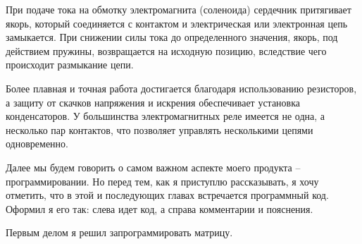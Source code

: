 \documentclass[a4paper, 12pt]{article}
\begin{document}
При подаче тока на обмотку электромагнита (соленоида) сердечник притягивает
якорь, который соединяется с контактом и электрическая или электронная цепь
замыкается. При снижении силы тока до определенного значения, якорь, под
действием пружины, возвращается на исходную позицию, вследствие чего
происходит размыкание цепи.

Более плавная и точная работа достигается благодаря использованию резисторов,
а защиту от скачков напряжения и искрения обеспечивает установка конденсаторов.
У большинства электромагнитных реле имеется не одна, а несколько пар
контактов, что позволяет управлять несколькими цепями одновременно.

Далее мы будем говорить о самом важном аспекте моего продукта --
программировании. Но перед тем, как я приступлю рассказывать, я хочу отметить,
что в этой и последующих главах встречается программный код. Оформил я его так:
слева идет код, а справа комментарии и пояснения.

Первым делом я решил запрограммировать матрицу.\newpage
\end{document}
